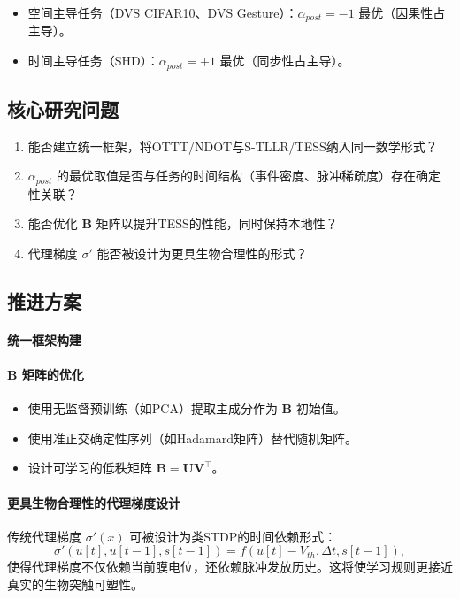 \documentclass[journal,12pt,onecolumn]{IEEEtran}
\begin{document}
\begin{itemize}
    \item 空间主导任务（DVS CIFAR10、DVS Gesture）：\(\alpha_{post}=-1\) 最优（因果性占主导）。
    \item 时间主导任务（SHD）：\(\alpha_{post}=+1\) 最优（同步性占主导）。
\end{itemize}

\subsection{核心研究问题}

\begin{enumerate}
    \item 能否建立统一框架，将OTTT/NDOT与S-TLLR/TESS纳入同一数学形式？
    \item \(\alpha_{post}\) 的最优取值是否与任务的时间结构（事件密度、脉冲稀疏度）存在确定性关联？
    \item 能否优化 \(\mathbf{B}\) 矩阵以提升TESS的性能，同时保持本地性？
    \item 代理梯度 \(\sigma'\) 能否被设计为更具生物合理性的形式？
\end{enumerate}

\subsection{推进方案}

\paragraph{统一框架构建}



\paragraph{\(\mathbf{B}\) 矩阵的优化}
\begin{itemize}
    \item 使用无监督预训练（如PCA）提取主成分作为 \(\mathbf{B}\) 初始值。
    \item 使用准正交确定性序列（如Hadamard矩阵）替代随机矩阵。
    \item 设计可学习的低秩矩阵 \(\mathbf{B} = \mathbf{U}\mathbf{V}^\top\)。
\end{itemize}

\paragraph{更具生物合理性的代理梯度设计}
传统代理梯度 \(\sigma'(x)\) 可被设计为类STDP的时间依赖形式：
\[
\sigma'(u[t], u[t-1], s[t-1]) = f\left(u[t] - V_{th}, \Delta t, s[t-1]\right),
\]
使得代理梯度不仅依赖当前膜电位，还依赖脉冲发放历史。这将使学习规则更接近真实的生物突触可塑性。
\end{document}
